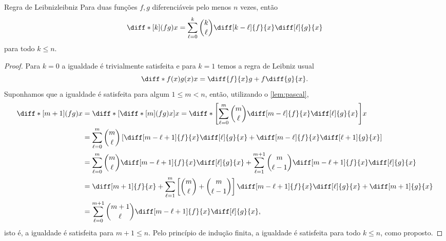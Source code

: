 \begin{lemma}{Regra de Leibniz}{leibniz}
    Para duas funções \(f, g\) diferenciáveis pelo menos \(n\) vezes, então
    \begin{equation*}
        \diff*[k]{(fg)}{x} = \sum_{\ell = 0}^{k} \binom{k}{\ell} \diff[k-\ell]{f}{x}\diff[\ell]{g}{x}
    \end{equation*}
    para todo \(k \leq n\).
\end{lemma}
\begin{proof}
    Para \(k = 0\) a igualdade é trivialmente satisfeita e para \(k = 1\) temos a regra de Leibniz usual
    \begin{equation*}
        \diff*{f(x)g(x)}{x} = \diff{f}{x}g + f\diff{g}{x}.
    \end{equation*}
    Suponhamos que a igualdade é satisfeita para algum \(1 \leq m < n\), então, utilizando o \cref{lem:pascal},
    \begin{align*}
        \diff*[m + 1]{(fg)}{x} &= \diff*{\left[\diff*[m]{(fg)}{x}\right]}{x} = \diff*{\left[\sum_{\ell = 0}^{m} \binom{m}{\ell}\diff[m-\ell]{f}{x}\diff[\ell]{g}{x}\right]}{x}\\
                               &= \sum_{\ell = 0}^m \binom{m}{\ell} \left[\diff[m-\ell+1]{f}{x}\diff[\ell]{g}{x} + \diff[m-\ell]{f}{x}\diff[\ell+1]{g}{x}\right]\\
                               &= \sum_{\ell = 0}^m \binom{m}{\ell} \diff[m-\ell+1]{f}{x}\diff[\ell]{g}{x} + \sum_{\ell=1}^{m+1} \binom{m}{\ell-1}\diff[m-\ell+1]{f}{x}\diff[\ell]{g}{x}\\
                               &= \diff[m+1]{f}{x} + \sum_{\ell = 1}^{m}\left[\binom{m}{\ell} + \binom{m}{\ell - 1}\right] \diff[m-\ell+1]{f}{x}\diff[\ell]{g}{x} + \diff[m+1]{g}{x}\\
                               &= \sum_{\ell = 0}^{m+1} \binom{m+1}{\ell}\diff[m-\ell+1]{f}{x}\diff[\ell]{g}{x},
    \end{align*}
    isto é, a igualdade é satisfeita para \(m + 1 \leq n\). Pelo princípio de indução finita, a igualdade é satisfeita para todo \(k \leq n\), como proposto.
\end{proof}

